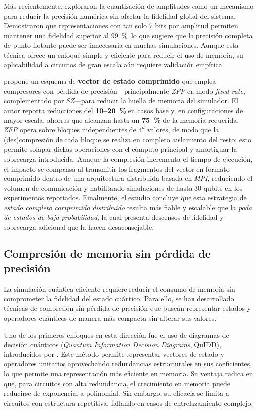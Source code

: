 Más recientemente, \textcite{Huffman2024} exploraron la cuantización de
amplitudes como un mecanismo para reducir la precisión numérica sin afectar la
fidelidad global del sistema. Demostraron que representaciones con tan solo 7 bits
por amplitud permiten mantener una fidelidad superior al 99~\%, lo que sugiere que
la precisión completa de punto flotante puede ser innecesaria en muchas simulaciones.
Aunque esta técnica ofrece un enfoque simple y eficiente para reducir el uso
de memoria, su aplicabilidad a circuitos de gran escala aún requiere validación
empírica.

\textcite{DiazToro2025} propone un esquema de \textbf{vector de estado
comprimido} que emplea compresores con pérdida de precisión—principalmente
\emph{ZFP} en modo \emph{fixed‑rate}, complementado por \emph{SZ}—para reducir
la huella de memoria del simulador. El autor reporta reducciones del \textbf{10--20~\%}
en casos base y, en configuraciones de mayor escala, ahorros que alcanzan hasta
un \textbf{75~\%} de la memoria requerida. \emph{ZFP} opera sobre bloques independientes
de $4^{d}$ valores, de modo que la (des)compresión de cada bloque se realiza en
completo aislamiento del resto; esto permite solapar dichas operaciones con el
cómputo principal y amortiguar la sobrecarga introducida. Aunque la compresión
incrementa el tiempo de ejecución, el impacto se compensa al transmitir los
fragmentos del vector en formato comprimido dentro de una arquitectura
distribuida basada en \emph{MPI}, reduciendo el volumen de comunicación y
habilitando simulaciones de hasta $30$ qubits en los experimentos reportados. Finalmente,
el estudio concluye que esta estrategia de \textit{estado completo comprimido
distribuido} resulta más fiable y escalable que la \textit{poda de estados de
baja probabilidad}, la cual presenta descensos de fidelidad y sobrecarga adicional
que la hacen desaconsejable.

\subsection{\normalsize{Compresión de memoria sin pérdida de precisión}}
La simulación cuántica eficiente requiere reducir el consumo de memoria sin
comprometer la fidelidad del estado cuántico. Para ello, se han desarrollado
técnicas de compresión sin pérdida de precisión que buscan representar estados
y operadores cuánticos de manera más compacta sin alterar sus valores.

Uno de los primeros enfoques en esta dirección fue el uso de diagramas de decisión
cuánticos (\textit{Quantum Information Decision Diagrams}, QuIDD),
introducidos por \textcite{Viamontes2003}. Este método permite representar
vectores de estado y operadores unitarios aprovechando redundancias
estructurales en sus coeficientes, lo que permite una representación más eficiente
en memoria. Su ventaja radica en que, para circuitos con alta redundancia, el
crecimiento en memoria puede reducirse de exponencial a polinomial. Sin embargo,
su eficacia se limita a circuitos con estructura repetitiva, fallando en casos
de entrelazamiento complejo.

